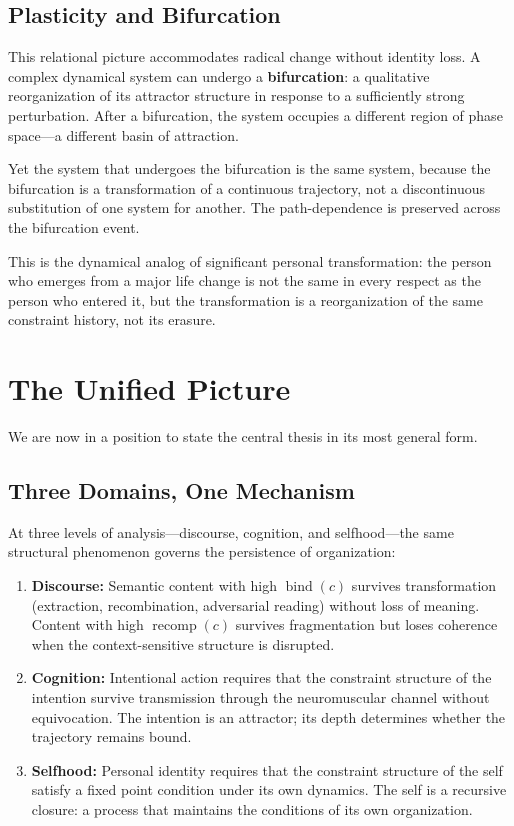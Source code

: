 \documentclass[11pt]{article}
\newcommand{\bind}{\operatorname{bind}}
\newcommand{\recomp}{\operatorname{recomp}}
\begin{document}
\subsection{Plasticity and Bifurcation}

This relational picture accommodates radical change without identity loss. A complex
dynamical system can undergo a \textbf{bifurcation}: a qualitative reorganization of its
attractor structure in response to a sufficiently strong perturbation. After a bifurcation,
the system occupies a different region of phase space—a different basin of attraction.

Yet the system that undergoes the bifurcation is the same system, because the bifurcation
is a transformation of a continuous trajectory, not a discontinuous substitution of one
system for another. The path-dependence is preserved across the bifurcation event.

This is the dynamical analog of significant personal transformation: the person who
emerges from a major life change is not the same in every respect as the person who
entered it, but the transformation is a reorganization of the same constraint history,
not its erasure.

\section{The Unified Picture}

We are now in a position to state the central thesis in its most general form.

\subsection{Three Domains, One Mechanism}

At three levels of analysis—discourse, cognition, and selfhood—the same structural
phenomenon governs the persistence of organization:

\begin{enumerate}
  \item \textbf{Discourse:} Semantic content with high $\bind(c)$ survives transformation
        (extraction, recombination, adversarial reading) without loss of meaning. Content
        with high $\recomp(c)$ survives fragmentation but loses coherence when the
        context-sensitive structure is disrupted.

  \item \textbf{Cognition:} Intentional action requires that the constraint structure of
        the intention survive transmission through the neuromuscular channel without
        equivocation. The intention is an attractor; its depth determines whether the
        trajectory remains bound.

  \item \textbf{Selfhood:} Personal identity requires that the constraint structure of
        the self satisfy a fixed point condition under its own dynamics. The self is a
        recursive closure: a process that maintains the conditions of its own organization.
\end{enumerate}
\end{document}

